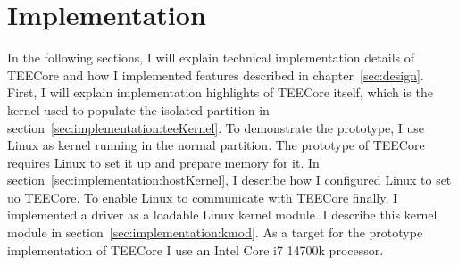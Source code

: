 \chapter{Implementation}
\label{sec:implementation}


In the following sections, I will explain technical implementation details of
TEECore and how I implemented features described in chapter~\ref{sec:design}.
First, I will explain implementation highlights of TEECore itself, which is the
kernel used to populate the isolated partition in
section~\ref{sec:implementation:teeKernel}. To demonstrate the prototype, I use
Linux as kernel running in the normal partition. The prototype of TEECore
requires Linux to set it up and prepare memory for it. In
section~\ref{sec:implementation:hostKernel}, I describe how I configured Linux
to set uo TEECore. To enable Linux to communicate with TEECore finally, I
implemented a driver as a loadable Linux kernel module. I describe this kernel
module in section~\ref{sec:implementation:kmod}. As a target for the prototype implementation of TEECore I
use an Intel Core i7 14700k processor.

